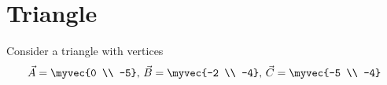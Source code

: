 \documentclass[11pt]{book}
\begin{document}
\frontmatter


\subtitle{Through Algebra}


\titlepage

\tableofcontents

\setcounter{page}{1}

\mainmatter

\chapter{Triangle}
Consider a triangle with vertices
\begin{align}
\vec{A} = \myvec{0 \\ -5},\,
\vec{B} = \myvec{-2 \\ -4},\,
\vec{C} = \myvec{-5 \\ -4}
\end{align}
\end{document}
